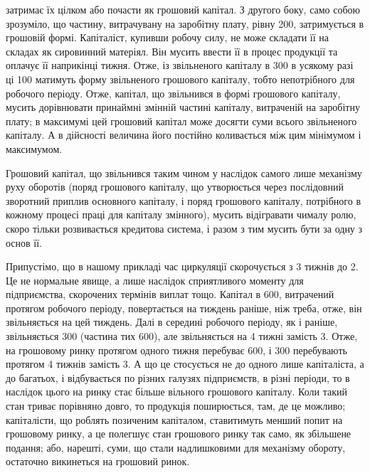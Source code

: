 \parcont{}  %
затримає їх цілком або почасти як грошовий капітал. З другого боку,
само собою зрозуміло, що частину, витрачувану на заробітну плату,
рівну 200, затримується в грошовій формі. Капіталіст, купивши
робочу силу, не може складати її на складах як сировинний матеріял.
Він мусить ввести її в процес продукції та оплачує її наприкінці тижня.
Отже, із звільненого капіталу в 300 в усякому разі ці 100 матимуть форму звільненого грошового капіталу, тобто непотрібного
для робочого періоду. Отже, капітал, що звільнився в формі грошового
капіталу, мусить дорівнювати принаймні змінній частині капіталу,
витраченій на заробітну плату; в максимумі цей грошовий капітал може
досягти суми всього звільненого капіталу. А в дійсності величина його
постійно коливається між цим мінімумом і максимумом.

Грошовий капітал, що звільнився таким чином у наслідок самого
лише механізму руху оборотів (поряд грошового капіталу, що утворюється
через послідовний зворотний приплив основного капіталу, і поряд грошового
капіталу, потрібного в кожному процесі праці для капіталу змінного),
мусить відігравати чималу ролю, скоро тільки розвивається кредитова
система, і разом з тим мусить бути за одну з основ її.

Припустімо, що в нашому прикладі час циркуляції скорочується
з 3 тижнів до 2. Це не нормальне явище, а лише наслідок сприятливого
моменту для підприємства, скорочених термінів виплат тощо. Капітал
в 600, витрачений протягом робочого періоду, повертається на
тиждень раніше, ніж треба, отже, він звільняється на цей тиждень. Далі
в середині робочого періоду, як і раніше, звільняється 300
(частина тих 600), але звільняється на 4 тижні замість 3.
Отже, на грошовому ринку протягом одного тижня перебуває 600, і 300 перебувають протягом 4 тижнів замість 3. А що це
стосується не до одного лише капіталіста, а до багатьох, і відбувається по
різних галузях підприємств, в різні періоди, то в наслідок цього на ринку
стає більше вільного грошового капіталу. Коли такий стан триває порівняно
довго, то продукція поширюється, там, де це можливо; капіталісти,
що роблять позиченим капіталом, ставитимуть менший попит на грошовому
ринку, а це полегшує стан грошового ринку так само, як збільшене
подання; або, нарешті, суми, що стали надлишковими для механізму
обороту, остаточно викинеться на грошовий ринок.


